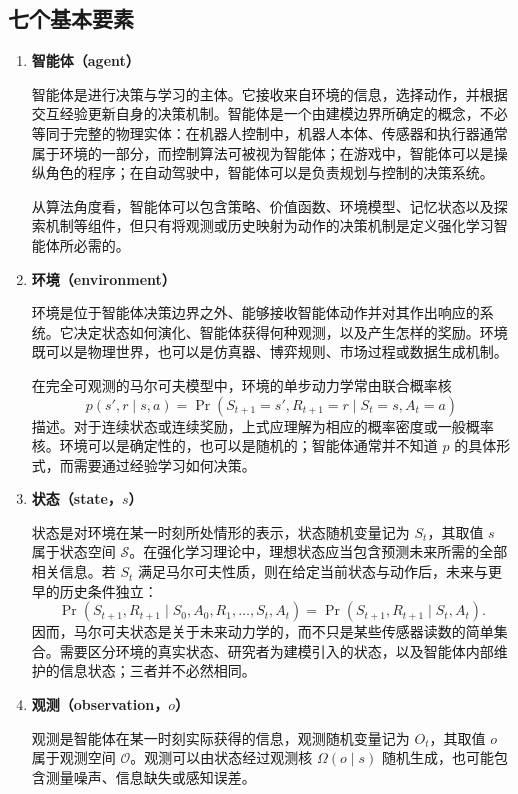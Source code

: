 \documentclass[UTF8,12pt,a4paper,fontset=fandol]{ctexbook}
\begin{document}
\subsection{七个基本要素}


\begin{enumerate}[label=\textbf{\arabic*.},leftmargin=3em]
  \item \textbf{智能体（agent）}


  智能体是进行决策与学习的主体。它接收来自环境的信息，选择动作，并根据交互经验更新自身的决策机制。智能体是一个由建模边界所确定的概念，不必等同于完整的物理实体：在机器人控制中，机器人本体、传感器和执行器通常属于环境的一部分，而控制算法可被视为智能体；在游戏中，智能体可以是操纵角色的程序；在自动驾驶中，智能体可以是负责规划与控制的决策系统。


  从算法角度看，智能体可以包含策略、价值函数、环境模型、记忆状态以及探索机制等组件，但只有将观测或历史映射为动作的决策机制是定义强化学习智能体所必需的。


  \item \textbf{环境（environment）}


  环境是位于智能体决策边界之外、能够接收智能体动作并对其作出响应的系统。它决定状态如何演化、智能体获得何种观测，以及产生怎样的奖励。环境既可以是物理世界，也可以是仿真器、博弈规则、市场过程或数据生成机制。


  在完全可观测的马尔可夫模型中，环境的单步动力学常由联合概率核
  \[
    p(s',r\mid s,a)
    =\Pr\!\left(S_{t+1}=s',R_{t+1}=r\mid S_t=s,A_t=a\right)
  \]
  描述。对于连续状态或连续奖励，上式应理解为相应的概率密度或一般概率核。环境可以是确定性的，也可以是随机的；智能体通常并不知道 $p$ 的具体形式，而需要通过经验学习如何决策。


  \item \textbf{状态（state，$s$）}


  状态是对环境在某一时刻所处情形的表示，状态随机变量记为 $S_t$，其取值 $s$ 属于状态空间 $\mathcal{S}$。在强化学习理论中，理想状态应当包含预测未来所需的全部相关信息。若 $S_t$ 满足马尔可夫性质，则在给定当前状态与动作后，未来与更早的历史条件独立：
  \[
    \Pr(S_{t+1},R_{t+1}\mid S_0,A_0,R_1,\ldots,S_t,A_t)
    =\Pr(S_{t+1},R_{t+1}\mid S_t,A_t).
  \]
  因而，马尔可夫状态是关于未来动力学的，而不只是某些传感器读数的简单集合。需要区分环境的真实状态、研究者为建模引入的状态，以及智能体内部维护的信息状态；三者并不必然相同。


  \item \textbf{观测（observation，$o$）}


  观测是智能体在某一时刻实际获得的信息，观测随机变量记为 $O_t$，其取值 $o$ 属于观测空间 $\mathcal{O}$。观测可以由状态经过观测核 $\Omega(o\mid s)$ 随机生成，也可能包含测量噪声、信息缺失或感知误差。



\end{enumerate}
\end{document}
